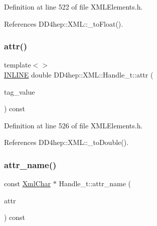 Definition at line 522 of file X\+M\+L\+Elements.\+h.



References D\+D4hep\+::\+X\+M\+L\+::\+\_\+to\+Float().

\hypertarget{class_d_d4hep_1_1_x_m_l_1_1_handle__t_a73550722df037e75f6ec31d07d929e72}{}\label{class_d_d4hep_1_1_x_m_l_1_1_handle__t_a73550722df037e75f6ec31d07d929e72} 
\subsubsection{\texorpdfstring{attr()}{attr()}\hspace{0.1cm}{\footnotesize\ttfamily [10/10]}}
{\footnotesize\ttfamily template$<$$>$ \\
\hyperlink{_x_m_l_elements_8h_a2eb6f9e0395b47b8d5e3eeae4fe0c116}{I\+N\+L\+I\+NE} double D\+D4hep\+::\+X\+M\+L\+::\+Handle\+\_\+t\+::attr (\begin{DoxyParamCaption}\item[{const \hyperlink{namespace_d_d4hep_1_1_x_m_l_a09e5d9cc86ed782f6826dfe0778c1815}{Xml\+Char} $\ast$}]{tag\+\_\+value }\end{DoxyParamCaption}) const}



Definition at line 526 of file X\+M\+L\+Elements.\+h.



References D\+D4hep\+::\+X\+M\+L\+::\+\_\+to\+Double().

\hypertarget{class_d_d4hep_1_1_x_m_l_1_1_handle__t_a39c297fc946cd4a93a1c750030b7edd8}{}\label{class_d_d4hep_1_1_x_m_l_1_1_handle__t_a39c297fc946cd4a93a1c750030b7edd8} 
\subsubsection{\texorpdfstring{attr\+\_\+name()}{attr\_name()}}
{\footnotesize\ttfamily const \hyperlink{namespace_d_d4hep_1_1_x_m_l_a09e5d9cc86ed782f6826dfe0778c1815}{Xml\+Char} $\ast$ Handle\+\_\+t\+::attr\+\_\+name (\begin{DoxyParamCaption}\item[{const \hyperlink{namespace_d_d4hep_1_1_x_m_l_a5c19b7116be99d69b4b22d911357baaf}{Attribute}}]{attr }\end{DoxyParamCaption}) const}



